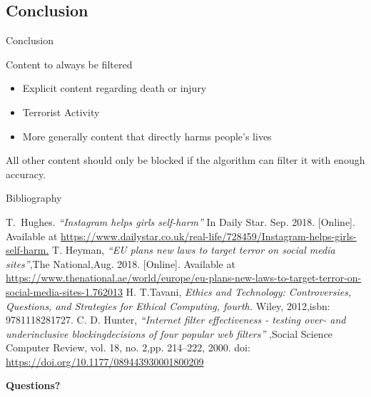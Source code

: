     \subsection{Conclusion}
    \begin{frame}{Conclusion}
    \begin{block}{Content to always be filtered}
    \begin{itemize}
        \item Explicit content regarding death or injury
        \item Terrorist Activity
        \item More generally content that directly harms people's lives
    \end{itemize}
    \end{block}
    
    All other content should only be blocked if the algorithm can filter it with enough accuracy.
        
    \end{frame}
    \begin{frame}[label=bibliography]{Bibliography}
    \footnotesize
      \begin{thebibliography}{9}
             T.~Hughes.
            \emph{“Instagram helps girls self-harm”} In Daily Star.
          Sep. 2018. [Online]. Available at \url{https://www.dailystar.co.uk/real-life/728459/Instagram-helps-girls-self-harm.}
              T. Heyman, 
              \emph{“EU plans new laws to target terror on social media sites”},The  National,Aug.  2018.  [Online].  Available at \url{https://www.thenational.ae/world/europe/eu-plans-new-laws-to-target-terror-on-social-media-sites-1.762013}
            H. T.Tavani,
            \emph{Ethics and Technology: Controversies, Questions, and Strategies for Ethical Computing, fourth.}
            Wiley, 2012,isbn: 9781118281727.
            C.  D.  Hunter, 
            \emph{“Internet  filter  effectiveness  -  testing  over-  and  underinclusive  blockingdecisions  of  four  popular  web  filters”}
            ,Social  Science  Computer  Review,  vol.  18,  no.  2,pp. 214–222, 2000. doi: \url{https://doi.org/10.1177/089443930001800209}
      \end{thebibliography}
    \end{frame}
    
    \begin{frame}{}
        \begin{center}
            \huge \textbf{Questions?}
        \end{center}
    \end{frame}
    
